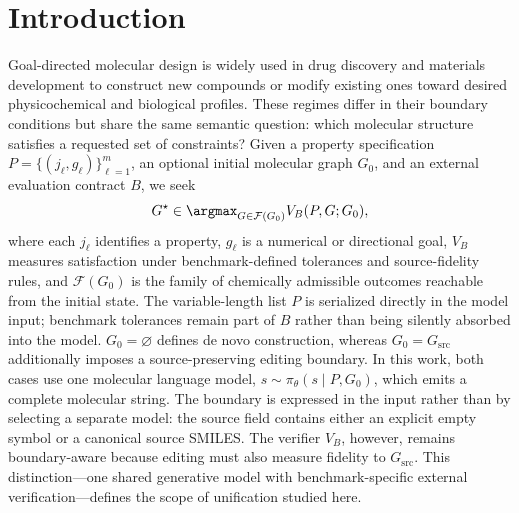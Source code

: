 \documentclass{article}
\begin{document}
\section{Introduction}
Goal-directed molecular design is widely used in drug discovery and materials
development to construct new compounds or modify existing ones toward desired
physicochemical and biological profiles. These regimes differ in their boundary
conditions but share the same semantic question: which molecular structure
satisfies a requested set of constraints? Given a property specification
$P=\{(j_\ell,g_\ell)\}_{\ell=1}^{m}$, an optional initial molecular graph
$G_0$, and an external evaluation contract $B$, we seek
\begin{equation}
  G^\star\in\argmax_{G\in\mathcal F(G_0)} V_B(P,G;G_0),
  \label{eq:intro-design-problem}
\end{equation}
where each $j_\ell$ identifies a property, $g_\ell$ is a numerical or
directional goal, $V_B$ measures satisfaction under benchmark-defined
tolerances and source-fidelity rules, and
$\mathcal F(G_0)$ is the family of chemically admissible outcomes reachable
from the initial state. The variable-length list $P$ is serialized directly in
the model input; benchmark tolerances remain part of $B$ rather than being
silently absorbed into the model. $G_0=\varnothing$ defines de novo
construction, whereas $G_0=G_{\mathrm{src}}$ additionally imposes a
source-preserving editing boundary. In this work, both cases use one molecular
language model,
$s\sim\pi_\theta(s\mid P,G_0)$, which emits a complete molecular string. The
boundary is expressed in the input rather than by selecting a separate model:
the source field contains either an explicit empty symbol or a canonical source
SMILES. The verifier $V_B$, however, remains boundary-aware because editing must
also measure fidelity to $G_{\mathrm{src}}$. This distinction---one shared
generative model with benchmark-specific external verification---defines the
scope of unification studied here.
\end{document}
